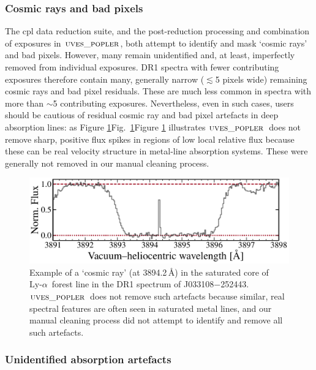 \documentclass[fleqn,usenatbib,usedcolumn]{mnras}
\renewcommand{\la}{\lesssim} %
\newcommand{\Fref}[1]{\ifhmode \ifnum\spacefactor=1001 Figure \ref{#1}\else Fig.\ \ref{#1}\fi \else Figure \ref{#1}\fi}
\newcommand{\lya}{\ensuremath{\textrm{Ly-}\alpha}}
\newcommand{\popler}{\ensuremath{\textsc{uves\_popler}}}
\begin{document}
\subsubsection{Cosmic rays and bad pixels}\label{sss:cosmic}

The {\sc cpl} data reduction suite, and the post-reduction processing and combination of exposures in \popler, both attempt to identify and mask `cosmic rays' and bad pixels. However, many remain unidentified and, at least, imperfectly removed from individual exposures. DR1 spectra with fewer contributing exposures therefore contain many, generally narrow ($\la$5 pixels wide) remaining cosmic rays and bad pixel residuals. These are much less common in spectra with more than $\sim$5 contributing exposures. Nevertheless, even in such cases, users should be cautious of residual cosmic ray and bad pixel artefacts in deep absorption lines: as \Fref{f:cosmic} illustrates \popler\ does not remove sharp, positive flux spikes in regions of low local relative flux because these can be real velocity structure in metal-line absorption systems. These were generally not removed in our manual cleaning process.

\begin{figure}
\begin{center}
\includegraphics[width=0.95\columnwidth]{DR1_cosmic.pdf}
\vspace{-1em}
\caption{Example of a `cosmic ray' (at 3894.2\,\AA) in the saturated core of \lya\ forest line in the DR1 spectrum of J033108$-$252443. \popler\ does not remove such artefacts because similar, real spectral features are often seen in saturated metal lines, and our manual cleaning process did not attempt to identify and remove all such artefacts.}
\label{f:cosmic}
\end{center}
\end{figure}


\subsubsection{Unidentified absorption artefacts}\label{sss:unidentified}
\end{document}
